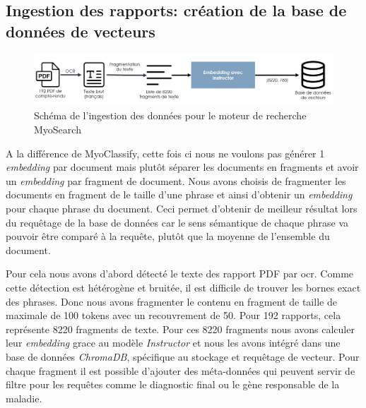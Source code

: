 \subsection{Ingestion des rapports: création de la base de données de vecteurs}
\begin{figure}[htbp]
  \centering
  \includegraphics[width=1\textwidth]{figures/myosearch_ingest.png}
  \caption[Ingestion des données dans MyoSearch]{Schéma de l'ingestion des données pour le moteur de recherche MyoSearch}
  \label{fig:myoclassify_conf}
\end{figure}
A la différence de MyoClassify, cette fois ci nous ne voulons pas générer 1 \textit{embedding} par document mais plutôt séparer les documents en fragments et avoir un \textit{embedding} par fragment de document. Nous avons choisis de fragmenter les documents en fragment de le taille d'une phrase et ainsi d'obtenir un \textit{embedding} pour chaque phrase du document. Ceci permet d'obtenir de meilleur résultat lors du requêtage de la base de données car le sens sémantique de chaque phrase va pouvoir être comparé à la requête, plutôt que la moyenne de l'ensemble du document.

Pour cela nous avons d'abord détecté le texte des rapport PDF par \gls{ocr}. Comme cette détection est hétérogène et bruitée, il est difficile de trouver les bornes exact des phrases. Donc nous avons fragmenter le contenu en fragment de taille de maximale de 100 tokens avec un recouvrement de 50. Pour 192 rapports, cela représente 8220 fragments de texte. Pour ces 8220 fragments nous avons calculer leur \textit{embedding} grace au modèle \textit{Instructor} et nous les avons intégré dans une base de données \textit{ChromaDB}, spécifique au stockage et requêtage de vecteur. Pour chaque fragment il est possible d'ajouter des méta-données qui peuvent servir de filtre pour les requêtes comme le diagnostic final ou le gène responsable de la maladie.

